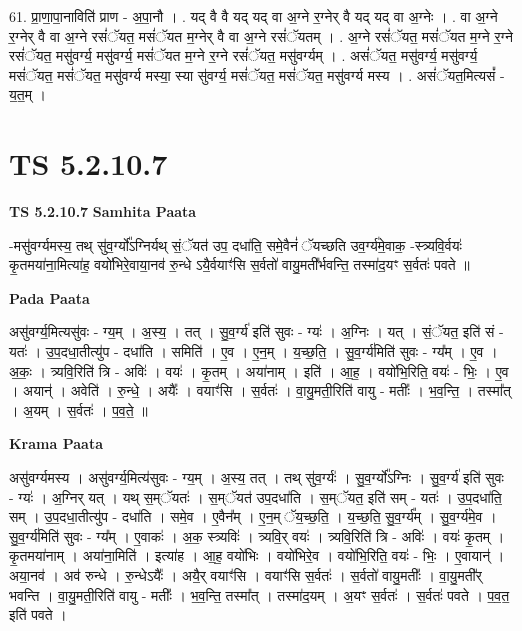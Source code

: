 \documentclass[17pt]{extarticle}
\begin{document}
61. प्रा॒णा॒पा॒नाविति॑ प्राण - अ॒पा॒नौ । . यद् वै वै यद् यद् वा अ॒ग्ने र॒ग्नेर् वै यद् यद् वा अ॒ग्नेः । . वा अ॒ग्ने र॒ग्नेर् वै वा अ॒ग्ने रसं॑ॅयत॒ मसं॑ॅयत म॒ग्नेर् वै वा अ॒ग्ने रसं॑ॅयतम् । . अ॒ग्ने रसं॑ॅयत॒ मसं॑ॅयत म॒ग्ने र॒ग्ने रसं॑ॅयत॒ मसु॑वर्ग्य॒ मसु॑वर्ग्य॒ मसं॑ॅयत म॒ग्ने र॒ग्ने रसं॑ॅयत॒ मसु॑वर्ग्यम् । . असं॑ॅयत॒ मसु॑वर्ग्य॒ मसु॑वर्ग्य॒ मसं॑ॅयत॒ मसं॑ॅयत॒ मसु॑वर्ग्य मस्या॒ स्या सु॑वर्ग्य॒ मसं॑ॅयत॒ मसं॑ॅयत॒ मसु॑वर्ग्य मस्य । . असं॑ॅयत॒मित्यसं᳚ - य॒त॒म् । \newline
\pagebreak
{}

\section{ TS 5.2.10.7 }

\textbf{TS 5.2.10.7 } \newline
\textbf{Samhita Paata} \newline

-मसु॑वर्ग्यमस्य॒ तथ् सु॑व॒र्ग्यो᳚ऽग्निर्यथ् सं॒ॅयत॑ उप॒ दधा॑ति॒ समे॒वैनं॑ ॅयच्छति उव॒र्ग्य॑मे॒वाक॒ -स्त्र्यवि॒र्वयः॑ कृ॒तमया॑ना॒मित्या॑ह॒ वयो॑भिरे॒वाया॒नव॑ रु॒न्धे ऽयै॒र्वयाꣳ॑सि स॒र्वतो॑ वायु॒मती᳚र्भवन्ति॒ तस्मा॑द॒यꣳ स॒र्वतः॑ पवते ॥ \newline

\textbf{Pada Paata} \newline

असु॑वर्ग्य॒मित्यसु॑वः - ग्य॒म् । अ॒स्य॒ । तत् । सु॒व॒र्ग्य॑ इति॑ सुवः - ग्यः॑ । अ॒ग्निः । यत् । सं॒ॅयत॒ इति॑ सं - यतः॑ । उ॒प॒दधा॒तीत्यु॑प - दधा॑ति । समिति॑ । ए॒व । ए॒न॒म् । य॒च्छ॒ति॒ । सु॒व॒र्ग्य॑मिति॑ सुवः - ग्य᳚म् । ए॒व । अ॒कः॒ । त्र्यवि॒रिति॑ त्रि - अविः॑ । वयः॑ । कृ॒तम् । अया॑नाम् । इति॑ । आ॒ह॒ । वयो॑भि॒रिति॒ वयः॑ - भिः॒ । ए॒व । अयान्॑ । अवेति॑ । रु॒न्धे॒ । अयैः᳚ । वयाꣳ॑सि । स॒र्वतः॑ । वा॒यु॒मती॒रिति॑ वायु - मतीः᳚ । भ॒व॒न्ति॒ । तस्मा᳚त् । अ॒यम् । स॒र्वतः॑ । प॒व॒ते॒ ॥  \newline


\textbf{Krama Paata} \newline

असु॑वर्ग्यमस्य । असु॑वर्ग्य॒मित्य॑सुवः - ग्य॒म् । अ॒स्य॒ तत् । तथ् सु॑व॒र्ग्यः॑ । सु॒व॒र्ग्यो᳚ऽग्निः । सु॒व॒र्ग्य॑ इति॑ सुवः - ग्यः॑ । अ॒ग्निर् यत् । यथ् स॒म्ॅयतः॑ । स॒म्ॅयत॑ उप॒दधा॑ति । स॒म्ॅयत॒ इति॑ सम् - यतः॑ । उ॒प॒दधा॑ति॒ सम् । उ॒प॒दधा॒तीत्यु॑प - दधा॑ति । समे॒व । ए॒वैन᳚म् । ए॒न॒म् ॅय॒च्छ॒ति॒ । य॒च्छ॒ति॒ सु॒व॒र्ग्य᳚म् । सु॒व॒र्ग्य॑मे॒व । सु॒व॒र्ग्य॑मिति॑ सुवः - ग्य᳚म् । ए॒वाकः॑ । अ॒क॒ स्त्र्यविः॑ । त्र्यवि॒र् वयः॑ । त्र्यवि॒रिति॑ त्रि - अविः॑ । वयः॑ कृ॒तम् । कृ॒तमया॑नाम् । अया॑ना॒मिति॑ । इत्या॑ह । आ॒ह॒ वयो॑भिः । वयो॑भिरे॒व । वयो॑भि॒रिति॒ वयः॑ - भिः॒ । ए॒वायान्॑ । अया॒नव॑ । अव॑ रुन्धे । रु॒न्धेऽयैः᳚ । अयै॒र् वयाꣳ॑सि । वयाꣳ॑सि स॒र्वतः॑ । स॒र्वतो॑ वायु॒मतीः᳚ । वा॒यु॒मती᳚र् भवन्ति । वा॒यु॒मती॒रिति॑ वायु - मतीः᳚ । भ॒व॒न्ति॒ तस्मा᳚त् । तस्मा॑द॒यम् । अ॒यꣳ स॒र्वतः॑ । स॒र्वतः॑ पवते । प॒व॒त॒ इति॑ पवते । \newline
\end{document}
